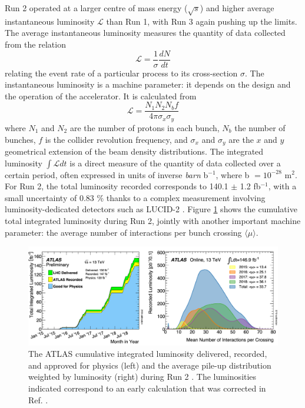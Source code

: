 Run 2 operated at a larger centre of mass energy ($\sqrt{s}$) and higher average instantaneous luminosity $\mathcal{L}$ than Run 1, with Run 3 again pushing up the limits. The average instantaneous luminosity measures the quantity of data collected from the relation
\begin{equation}
  \mathcal{L} = \frac{1}{\sigma}\frac{dN}{dt}
\end{equation}
relating the event rate of a particular process to its cross-section $\sigma$. The instantaneous luminosity is a machine parameter: it depends on the design and the operation of the accelerator. It is calculated from
\begin{equation}
  \mathcal{L} = \frac{N_1N_2N_bf}{4\pi\sigma_x\sigma_y}
\end{equation}
where $N_1$ and $N_2$ are the number of protons in each bunch, $N_b$ the number of bunches, $f$ is the collider revolution frequency, and $\sigma_x$ and $\sigma_y$ are the $x$ and $y$ geometrical extension of the beam density distributions. The integrated luminosity $\int \mathcal{L} dt$ is a direct measure of the quantity of data collected over a certain period, often expressed in units of inverse \textit{barn} b$^{-1}$, where b $= 10^{-28}$ m$^{2}$. For Run 2, the total luminosity recorded corresponds to 140.1 $\pm$ 1.2 fb$^{-1}$, with a small uncertainty of 0.83 \% \cite{ATLAS:2022hro} thanks to a complex measurement involving luminosity-dedicated detectors such as LUCID-2 \cite{Avoni_2018}. Figure \ref{fig-atlasLumiPileup} shows the cumulative total integrated luminosity during Run 2, jointly with another important machine parameter: the average number of interactions per bunch crossing $\langle \mu\rangle$. 

\begin{figure}[!h]
  \centering
  \includegraphics[width=\textwidth]{Images/ATLAS/recoATLAS.png}
  \caption{The ATLAS cumulative integrated luminosity delivered, recorded, and approved for physics (left) and the average pile-up distribution weighted by luminosity (right) during Run 2  \cite{PubAtlasLumi}. The luminosities indicated correspond to an early calculation that was corrected in Ref. \cite{ATLAS:2022hro}.}
  \label{fig-atlasLumiPileup}
\end{figure}

